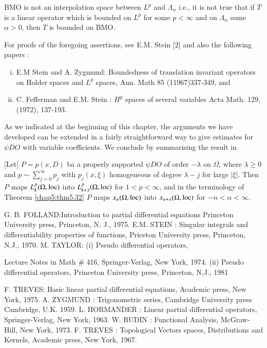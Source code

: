 \begin{warning}
  BMO  is not an interpolation space between $L^p$ and $ \Lambda
  _\alpha$ i.e., it is not true that if $T$ is a linear operator which
  is bounded on $L^p$ for some $p < \infty$ and on $ \Lambda_\alpha $
  some $\alpha > 0$, then $T$ is bounded on BMO. 
\end{warning}

For proofs of the foregoing assertions, see E.M. Stein [$2$] and also
the following papers : 
\begin{enumerate}[(i)]
\item E.M Stein and A. Zygmund: Boundedness of translation invariant
  operators on Holder spaces and $L^p$ spaces, Ann. Math 85
  (11967)337-349,  and  
\item  C. Fefferman and E.M. Stein : $H^p$ spaces of several variables
  Acta Math. 129,  (1972), 137-193. 
\end{enumerate}

As we indicated at the beginning of this chapter, the arguments we
have developed can be extended in a fairly straightforward way to give
estimates for $\psi DO$ with variable coefficients. We conclude by
summarising the result in  

\setcounter{thm}{34}
\begin{thm}\label{chap5:thm5.35}%
  [Let] $P=p(x,D)$ ba a properly supported  $\psi DO$ of
    order  $-\lambda $  on  $\Omega $, where  $\lambda
  \ge 0$  and  $p \sim \sum\limits^{\infty}_{j=0} p_j$ 
    with  $p_j(x, \xi)$ homogeneous of degree  $\lambda - j$ 
       for large  $ | \xi  | $.  Then  $P$ maps $L^p_k
      (\Omega, \operatorname{loc})$ into $L^p_{k+\lambda}(\Omega,  \operatorname{loc})$ 
      for  $1 < p < \infty$,  and in the terminology of Theorem
        \ref{chap5:thm5.32}  $P$  maps $x_\alpha (\Omega,  \operatorname{loc})$  into
       $x_{\alpha + \lambda}(\Omega, \operatorname{loc})$ for $- n < \alpha
      < \infty $. 
 \end{thm}
 
\begin{thebibliography}{99}
 { G. B. FOLLAND}:\pageoriginale Introduction to partial differential
  equations Princeton University press, Princeton, N. J., 1975. 
 {E.M. STEIN }: Singular integrals and differentiability
  properties of functions, Priceton University press, Princeton, N.J.,
  1970. 
 {M. TAYLOR}: (i) Pseudo differential operators,

Lecture Notes in Math \# 416, Springer-Verlag, New York, 1974.
(ii) Pseudo differential operators,
Princeton University press, Princeton, N,J., 1981

 {F. TREVES}: Basic linear partial differential equations,
  Academic press, New York, 1975. 
 {A. ZYGMUND} : Trigonometric series, Cambridge University
  press Cambridge, U.K. 1959. 
 { L. HORMANDER }: Linear partial differential operators,
  Springer-Verlag, New York, 1963. 
 { W. RUDIN }: Functional Analysis, McGraw-Hill, New York,
  1973. 
 { F. TREVES }: Topological Vectors spaces, Distributions
  and Kernels, Academic press, New York, 1967. 
\end{thebibliography} 
